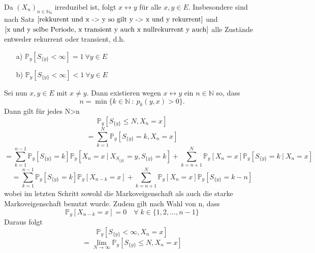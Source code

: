 Da $(X_{n})_{n \in \mathbb{N}_{0}}$ irreduzibel ist, folgt $x \leftrightarrow y$ für alle $x,y \in E$. Insbesondere sind nach Satz $\ref{rekkurent und x -> y so gilt y -> x und y rekurrent}$ und $\ref{x und y selbe Periode, x transient y auch x nullrekurrent y auch}$ alle Zustände entweder rekurrent oder transient, d.h.
\begin{itemize}
\item[a)] $\mathbb{P}_{y}[S_{\lbrace y \rbrace} < \infty] = 1 \: \forall y \in E$
\item[b)] $\mathbb{P}_{y}[S_{\lbrace y \rbrace} < \infty] < 1 \: \forall y \in E$
\end{itemize}
Sei nun $x,y \in E$ mit $x \neq y$. Dann existieren wegen $x \leftrightarrow y$ ein $n \in \mathbb{N}$ so, dass
\begin{equation*}
n = \min \lbrace k \in \mathbb{N} \: : \: p_{k}(y,x)>0 \rbrace.
\end{equation*}
Dann gilt für jedes N>n
\begin{equation*}
\mathbb{P}_{y}[S_{\lbrace y \rbrace} \leq N, X_{n} = x]
\end{equation*}
\begin{equation*}
= \sum_{k=1}^{N} \mathbb{P}_{y}[S_{\lbrace y \rbrace} = k, X_{n} = x]
\end{equation*}
\begin{equation*}
= \sum_{k=1}^{n-1} \mathbb{P}_{y}[S_{\lbrace y \rbrace} = k]\mathbb{P}_{y}[X_{n} = x \: | \: X_{S_{\lbrace y \rbrace}} = y, S_{\lbrace y \rbrace} = k] + \sum_{k=n+1}^{N} \mathbb{P}_{y}[X_{n} =x]\mathbb{P}_{y}[S_{\lbrace y \rbrace} = k \: | \: X_{n} = x]
\end{equation*}
\begin{equation*}
= \sum_{k=1}^{n-1} \mathbb{P}_{y}[S_{\lbrace y \rbrace} = k]\mathbb{P}_{y}[X_{n-k} = x] + \sum_{k=n+1}^{N} \mathbb{P}_{y}[X_{n} =x]\mathbb{P}_{y}[S_{\lbrace y \rbrace} = k-n]
\end{equation*}
wobei im letzten Schritt sowohl die Markoveigenschaft als auch die starke Markoveigenschaft benutzt wurde. Zudem gilt nach Wahl von n, dass
\begin{equation*}
\mathbb{P}_{y}[X_{n-k} = x] = 0 \quad \forall \; k \in \lbrace 1,2,...,n-1 \rbrace
\end{equation*}
Daraus folgt
\begin{equation*}
\mathbb{P}_{y}[S_{\lbrace y \rbrace} < \infty, X_{n} = x]
\end{equation*}
\begin{equation*}
= \lim_{N \to \infty} \mathbb{P}_{y}[S_{\lbrace y \rbrace} \leq N, X_{n} = x]
\end{equation*}
